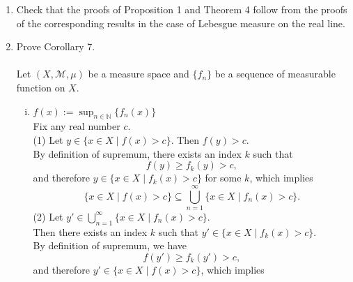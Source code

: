 \begin{enumerate}
    \item Check that the proofs of Proposition 1 and Theorem 4 follow from the proofs of the corresponding results in the case of Lebesgue measure on the real line.
    \item Prove Corollary 7.\\
    \\Let $(X,\mathcal{M},\mu)$ be a measure space and $\{f_n\}$ be a sequence of measurable function on $X$.
    \\\begin{enumerate}[(i)]
        \item $f(x):=\sup_{n\in\mathbb{N}}\{f_n(x)\}$
        \\Fix any real number $c$.
        \\(1) Let $y\in\{x\in X\mid f(x)>c\}$.
        Then $f(y)>c$.
        \\By definition of supremum, there exists an index $k$ such that 
        \[
            f(y)\ge f_k(y)>c,
        \]
        and therefore $y\in\{x\in X\mid f_k(x)>c\}$ for some $k$, which implies
        \[
            \{x\in X\mid f(x)>c\}\subseteq\bigcup_{n=1}^\infty\{x\in X\mid f_n(x)>c\}.\tag{1}
        \]
        (2) Let $y'\in\bigcup_{n=1}^\infty\{x\in X\mid f_n(x)>c\}$.
        \\Then there exists an index $k$ such that $y'\in\{x\in X\mid f_k(x)>c\}$.
        \\By definition of supremum, we have 
        \[
            f(y')\ge f_k(y')>c,
        \]
        and therefore $y'\in\{x\in X\mid f(x)>c\}$, which implies
        

\end{enumerate}
\end{enumerate}
